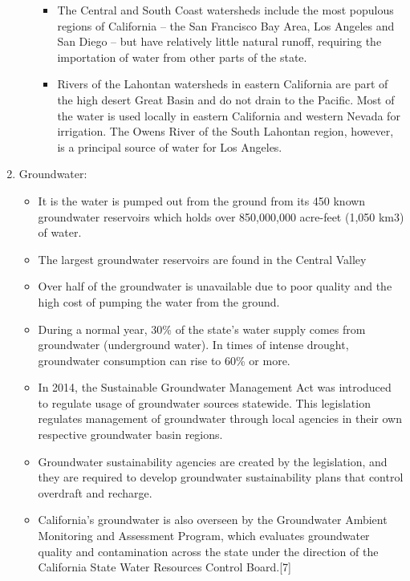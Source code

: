 \documentclass{article}
\begin{document}
\begin{enumerate}
\begin{itemize}
\begin{itemize}
\item The Central and South Coast watersheds include the most populous regions of California – the San Francisco Bay Area, Los Angeles and San Diego – but have relatively little natural runoff, requiring the importation of water from other parts of the state.\\

\item Rivers of the Lahontan watersheds in eastern California are part of the high desert Great Basin and do not drain to the Pacific. Most of the water is used locally in eastern California and western Nevada for irrigation. The Owens River of the South Lahontan region, however, is a principal source of water for Los Angeles.\\
\end{itemize}
\end{itemize}
\item Groundwater:
\begin{itemize}
\item It is the water is pumped out from the ground from its 450 known groundwater reservoirs which holds over 850,000,000 acre-feet (1,050 km3) of water.
\item The largest groundwater reservoirs are found in the Central Valley
\item Over half of the groundwater is unavailable due to poor quality and the high cost of pumping the water from the ground.
\item During a normal year, 30\% of the state's water supply comes from groundwater (underground water). In times of intense drought, groundwater consumption can rise to 60\% or more.
\item In 2014, the Sustainable Groundwater Management Act was introduced to regulate usage of groundwater sources statewide. This legislation regulates management of groundwater through local agencies in their own respective groundwater basin regions.
\item Groundwater sustainability agencies are created by the legislation, and they are required to develop groundwater sustainability plans that control overdraft and recharge.
\item California's groundwater is also overseen by the Groundwater Ambient Monitoring and Assessment Program, which evaluates groundwater quality and contamination across the state under the direction of the California State Water Resources Control Board.[7]
\end{itemize}
\end{enumerate}
\end{document}
